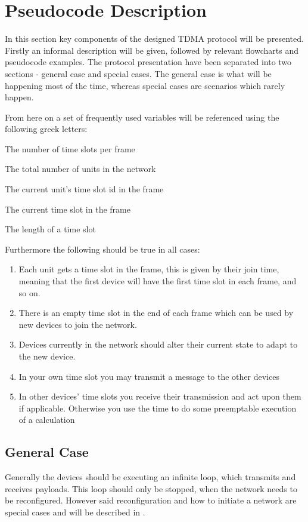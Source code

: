 \section{Pseudocode Description}
In this section key components of the designed TDMA protocol will be presented.
Firstly an informal description will be given, followed by relevant flowcharts and pseudocode examples.
The protocol presentation have been separated into two sections - general case and special cases. 
The general case is what will be happening most of the time, whereas special cases are scenarios which rarely happen. 

From here on a set of frequently used variables will be referenced using the following greek letters: 
\begin{description}[labelindent=\parindent]
    \item[$\alpha$] The number of time slots per frame
    \item[$\beta$] The total number of units in the network
    \item[$\kappa$] The current unit's time slot id in the frame
    \item[$\lambda$] The current time slot in the frame
    \item[$\rho$] The length of a time slot
\end{description}  
\noindent
Furthermore the following should be true in all cases: 
\begin{enumerate}[label=\itshape \alph*\upshape)]
    \item Each unit gets a time slot in the frame, this is given by their join time, meaning that the first device will have the first time slot in each frame, and so on.
    \item There is an empty time slot in the end of each frame which can be used by new devices to join the network.
    \item Devices currently in the network should alter their current state to adapt to the new device.
    \item In your own time slot you may transmit a message to the other devices
    \item In other devices' time slots you receive their transmission and act upon them if applicable. Otherwise you use the time to do some preemptable execution of a calculation
\end{enumerate}
                    
\subsection{General Case} %
\label{sub:general_case}
Generally the devices should be executing an infinite loop, which transmits and receives payloads.
This loop should only be stopped, when the network needs to be reconfigured.
However said reconfiguration and how to initiate a network are special cases and will be described in .

